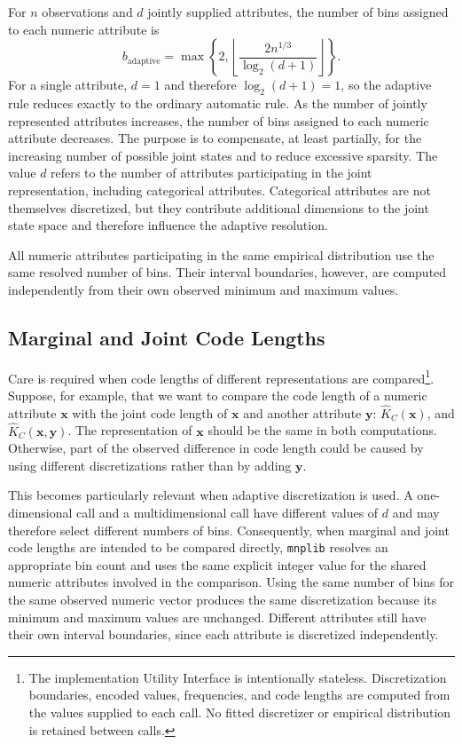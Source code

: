 For $n$ observations and $d$ jointly supplied attributes, the number of bins assigned to each numeric attribute is
$$
b_{\mathrm{adaptive}} =
\max \left\{2, \left\lfloor \frac{2n^{1/3}}{\log_2(d+1)} \right\rfloor \right\}.
$$
For a single attribute, $d=1$ and therefore $\log_2(d+1)=1$, so the adaptive rule reduces exactly to the ordinary automatic rule. As the number of jointly represented attributes increases, the number of bins assigned to each numeric attribute decreases. The purpose is to compensate, at least partially, for the increasing number of possible joint states and to reduce excessive sparsity. The value $d$ refers to the number of attributes participating in the joint representation, including categorical attributes. Categorical attributes are not themselves discretized, but they contribute additional dimensions to the joint state space and therefore influence the adaptive resolution.

All numeric attributes participating in the same empirical distribution use the same resolved number of bins. Their interval boundaries, however, are computed independently from their own observed minimum and maximum values.

\subsection*{Marginal and Joint Code Lengths}

Care is required when code lengths of different representations are compared\footnote{The implementation Utility Interface is intentionally stateless. Discretization boundaries, encoded values, frequencies, and code lengths are computed from the values supplied to each call. No fitted discretizer or empirical distribution is retained between calls.}. Suppose, for example, that we want to compare the code length of a numeric attribute $\mathbf{x}$ with the joint code length of $\mathbf{x}$ and another attribute $\mathbf{y}$: $\hat{K}_C(\mathbf{x})$, and $\hat{K}_C(\mathbf{x},\mathbf{y})$. The representation of $\mathbf{x}$ should be the same in both computations. Otherwise, part of the observed difference in code length could be caused by using different discretizations rather than by adding $\mathbf{y}$.

This becomes particularly relevant when adaptive discretization is used. A one-dimensional call and a multidimensional call have different values of $d$ and may therefore select different numbers of bins. Consequently, when marginal and joint code lengths are intended to be compared directly, \texttt{mnplib} resolves an appropriate bin count and uses the same explicit integer value for the shared numeric attributes involved in the comparison. Using the same number of bins for the same observed numeric vector produces the same discretization because its minimum and maximum values are unchanged. Different attributes still have their own interval boundaries, since each attribute is discretized independently.

